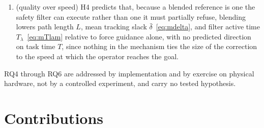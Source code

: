 \begin{enumerate}[nosep, label=\textbf{H\arabic*.}]
\item (quality over speed) H4 predicts that, because a blended reference is one the safety filter can execute rather than one it must partially refuse, blending lowers path length $L$, mean tracking slack $\bar{\delta}$~\eqref{eq:mdelta}, and filter active time $T_{\lambda}$~\eqref{eq:mTlam} relative to force guidance alone, with no predicted direction on task time $T$, since nothing in the mechanism ties the size of the correction to the speed at which the operator reaches the goal.
\end{enumerate}

RQ4 through RQ6 are addressed by implementation and by exercise on physical hardware, not by a controlled experiment, and carry no tested hypothesis.

\section{Contributions}
\label{sec:contributions}

